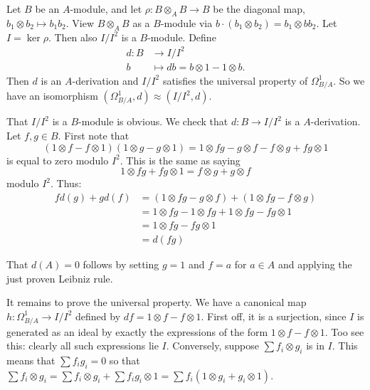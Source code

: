 \documentclass[11pt, english]{article}
\begin{document}
\begin{exc}
\label{ex_isquared}
Let $B$ be an $A$-module, and let $\rho:B \otimes_A B \to B$ be the diagonal map, $b_1 \otimes b_2 \mapsto b_1b_2$. View $B \otimes_A B$ as a $B$-module via $b\cdot (b_1 \otimes b_2) = b_1 \otimes bb_2$. Let $I = \ker \rho$. Then also $I/I^2$ is a $B$-module. Define
\begin{align*}
d:B &\to I/I^2 \\
b &\mapsto db = b \otimes 1 - 1 \otimes b.
\end{align*}
Then $d$ is an $A$-derivation and $I/I^2$ satisfies the universal property of $\Omega_{B/A} ^1$. So we have an isomorphism $(\Omega_{B/A}^1,d) \approx (I/I^2,d)$.
\end{exc}
\begin{sol}
That $I/I^2$ is a $B$-module is obvious. We check that $d:B \to I/I^2$ is a $A$-derivation. Let $f,g \in B$. First note that
\begin{equation}
\label{eq:prod}
(1 \otimes f - f\otimes 1)(1 \otimes g - g \otimes 1) = 1 \otimes fg - g \otimes f -f \otimes g + fg \otimes 1 
\end{equation}
is equal to zero modulo $I ^2$.  This is the same as saying
\[
1 \otimes fg + fg \otimes 1 = f \otimes g + g \otimes f
\]
modulo $I ^2$. Thus:
\begin{align*}
fd(g)+gd(f) &= (1 \otimes fg - g \otimes f) + (1 \otimes fg - f \otimes g) \\
&= 1 \otimes fg - 1 \otimes fg + 1 \otimes fg - fg \otimes 1 \\
&= 1 \otimes fg - fg \otimes 1 \\
&= d(fg) 
\end{align*} 

That $d(A)=0$ follows by setting $g=1$ and $f=a$ for $a \in A$ and applying the just proven Leibniz rule.

It remains to prove the universal property. We have a canonical map $h: \Omega_{B/A}^1 \to I/I^2$ defined by $df = 1 \otimes f - f \otimes 1$. First off, it is a surjection, since $I$ is generated as an ideal by exactly the expressions of the form $1 \otimes f - f \otimes 1$. Too see this: clearly all such expressions lie $I$. Conversely, suppose $\sum f_i \otimes g_i$ is in $I$. This means that $\sum f_ig_i = 0$ so that $\sum f_i \otimes g_i = \sum f_i \otimes g_i + \sum f_ig_i \otimes 1 = \sum f_i(1 \otimes g_i + g_i \otimes 1)$. 


\end{sol}
\end{document}
